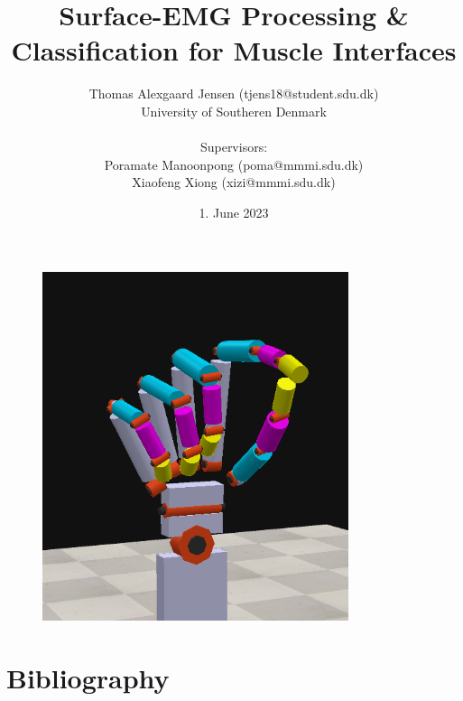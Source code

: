 \documentclass[a4paper, 12pt]{article}
\title{\textbf{Surface-EMG Processing \& Classification for Muscle Interfaces}}
\author{Thomas Alexgaard Jensen (tjens18@student.sdu.dk)
\\University of Southeren Denmark
\\
\\Supervisors: 
\\Poramate Manoonpong (poma@mmmi.sdu.dk)
\\Xiaofeng Xiong (xizi@mmmi.sdu.dk)
}
\date{1. June 2023}
\begin{document}
\thispagestyle{empty}
\maketitle
\thispagestyle{empty}
\begin{figure}[h]
\begin{center}
\includegraphics[width=0.8\textwidth]{pulppinch_grip.png}
\end{center}
\end{figure}


\newpage


\setcounter{page}{1}

\newpage

\newpage


\newpage

\tableofcontents
\newpage


\newpage

\newpage

\newpage

\newpage

\newpage

\newpage

\newpage

\section{Bibliography}
\listoffigures
\listoftables
\end{document}
